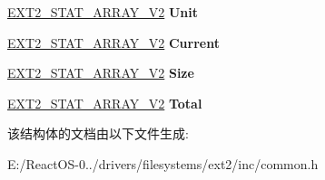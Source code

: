 \begin{DoxyCompactItemize}
\begin{tabbing}
\end{tabbing}\item 
\mbox{\label{struct___e_x_t2___p_e_r_f___s_t_a_t_i_s_t_i_c_s___v2_a326ac95147b75058e6b4a34a916da04e}} 
\hyperlink{union_e_x_t2___s_t_a_t___a_r_r_a_y___v2}{E\+X\+T2\+\_\+\+S\+T\+A\+T\+\_\+\+A\+R\+R\+A\+Y\+\_\+\+V2} {\bfseries Unit}
\item 
\mbox{\label{struct___e_x_t2___p_e_r_f___s_t_a_t_i_s_t_i_c_s___v2_a39cc46bf37fd9c106992fb9c4177bdaf}} 
\hyperlink{union_e_x_t2___s_t_a_t___a_r_r_a_y___v2}{E\+X\+T2\+\_\+\+S\+T\+A\+T\+\_\+\+A\+R\+R\+A\+Y\+\_\+\+V2} {\bfseries Current}
\item 
\mbox{\label{struct___e_x_t2___p_e_r_f___s_t_a_t_i_s_t_i_c_s___v2_ab9aac871195d6b28a880b9843777daeb}} 
\hyperlink{union_e_x_t2___s_t_a_t___a_r_r_a_y___v2}{E\+X\+T2\+\_\+\+S\+T\+A\+T\+\_\+\+A\+R\+R\+A\+Y\+\_\+\+V2} {\bfseries Size}
\item 
\mbox{\label{struct___e_x_t2___p_e_r_f___s_t_a_t_i_s_t_i_c_s___v2_aaba05225f739803c4ff56fae370f1584}} 
\hyperlink{union_e_x_t2___s_t_a_t___a_r_r_a_y___v2}{E\+X\+T2\+\_\+\+S\+T\+A\+T\+\_\+\+A\+R\+R\+A\+Y\+\_\+\+V2} {\bfseries Total}
\end{DoxyCompactItemize}


该结构体的文档由以下文件生成\+:\begin{DoxyCompactItemize}
\item 
E\+:/\+React\+O\+S-\/0../drivers/filesystems/ext2/inc/common.\+h\end{DoxyCompactItemize}
